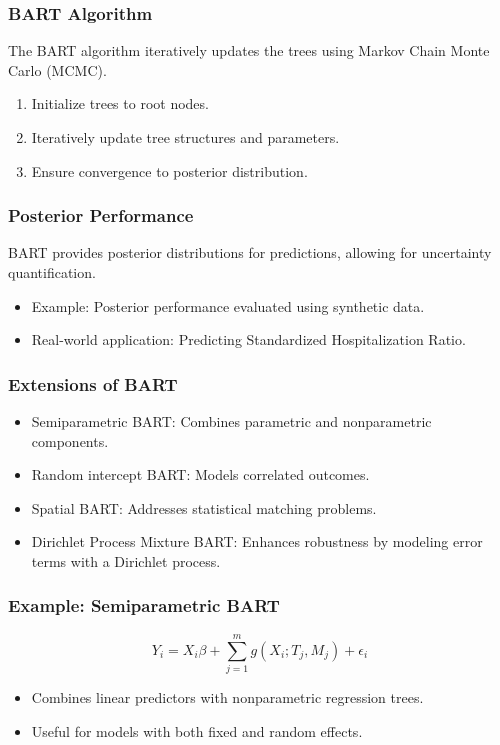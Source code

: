 \documentclass{beamer}
\begin{document}
\begin{frame}
\frametitle{BART Algorithm}
The BART algorithm iteratively updates the trees using Markov Chain Monte Carlo (MCMC).
\begin{enumerate}
    \item Initialize trees to root nodes.
    \item Iteratively update tree structures and parameters.
    \item Ensure convergence to posterior distribution.
\end{enumerate}
\end{frame}

\begin{frame}
\frametitle{Posterior Performance}
BART provides posterior distributions for predictions, allowing for uncertainty quantification.
\begin{itemize}
    \item Example: Posterior performance evaluated using synthetic data.
    \item Real-world application: Predicting Standardized Hospitalization Ratio.
\end{itemize}
\end{frame}

\begin{frame}
\frametitle{Extensions of BART}
\begin{itemize}
    \item Semiparametric BART: Combines parametric and nonparametric components.
    \item Random intercept BART: Models correlated outcomes.
    \item Spatial BART: Addresses statistical matching problems.
    \item Dirichlet Process Mixture BART: Enhances robustness by modeling error terms with a Dirichlet process.
\end{itemize}
\end{frame}

\begin{frame}
\frametitle{Example: Semiparametric BART}
\begin{equation}
Y_i = X_i \beta + \sum_{j=1}^{m} g(X_i; T_j, M_j) + \epsilon_i
\end{equation}
\begin{itemize}
    \item Combines linear predictors with nonparametric regression trees.
    \item Useful for models with both fixed and random effects.
\end{itemize}
\end{frame}
\end{document}
